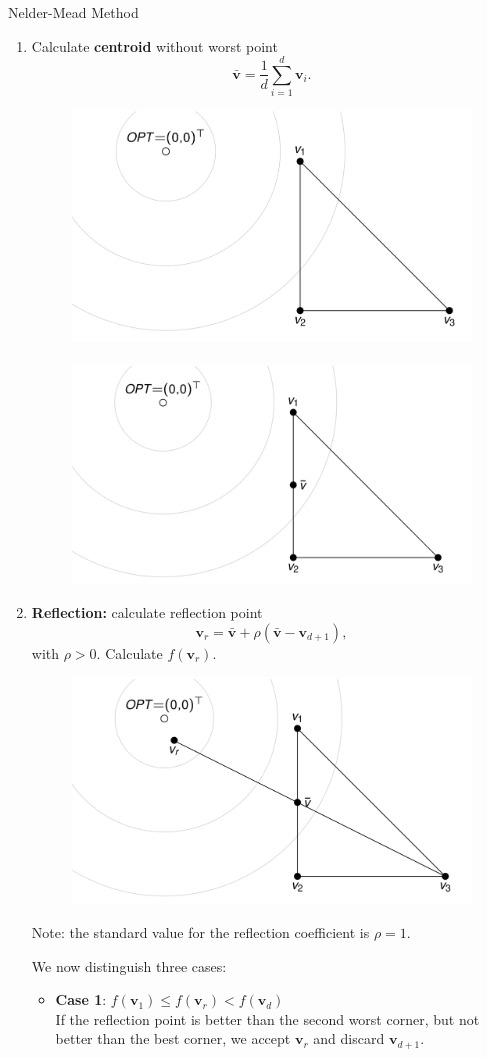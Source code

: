 \documentclass[11pt,compress,t,notes=noshow, xcolor=table]{beamer}
\begin{document}
\begin{vbframe}{Nelder-Mead Method}
\begin{enumerate}
\item Calculate \textbf{centroid} without worst point
$$
\bar{\mathbf{v}} = \frac{1}{d} \sum_{i = 1}^d \mathbf{v}_i.
$$

\begin{figure}
\includegraphics[width = 0.43\linewidth]{figure_man/Nelder02.png} ~~~ \includegraphics[width = 0.43\linewidth]{figure_man/Nelder03.png}
\end{figure}

\framebreak

\item \textbf{Reflection:} calculate reflection point
$$
\mathbf{v}_r = \bar{\mathbf{v}} + \rho (\bar{\mathbf{v}} - \mathbf{v}_{d + 1}),
$$
with $\rho > 0$. Calculate $f(\mathbf{v}_r)$.\\

\vspace{0.4cm}
\begin{figure}
\includegraphics[width = 0.43\linewidth]{figure_man/Nelder04.png} 
\end{figure}

Note: the standard value for the reflection coefficient is $\rho = 1$. 
\footnotesize



\small
\framebreak
\vspace{0.2cm}
We now distinguish three cases:


\begin{itemize}
\small
\item \textbf{Case 1}: $f(\mathbf{v}_1) \leq f(\mathbf{v}_r) < f(\mathbf{v}_d)$ \\
If the reflection point is better than the second worst corner, but not better than the best corner, we accept $\mathbf{v}_r$ and discard $\mathbf{v}_{d + 1}$.
\end{itemize}



\end{enumerate}
\end{vbframe}
\end{document}
